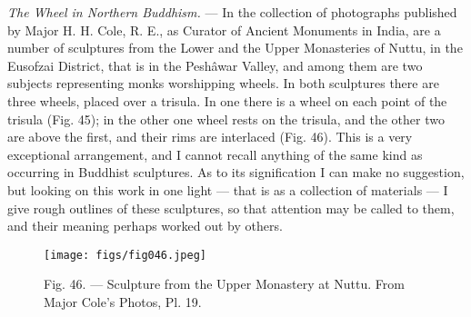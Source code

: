 \documentclass[a4paper, 11pt, oneside, polutonikogreek, english]{article}
\begin{document}
\emph{The Wheel in Northern Buddhism.} --- In the collection of photographs published by Major H. H. Cole, R. E., as Curator of Ancient Monuments in India, are a number of sculptures from the Lower and the Upper Monasteries of Nuttu, in the Eusofzai District, that is in the Peshâwar Valley, and among them are two subjects representing monks worshipping wheels. In both sculptures there are three wheels, placed over a trisula. In one there is a wheel on each point of the trisula (Fig. 45); in the other one wheel rests on the trisula, and the other two are above the first, and their rims are interlaced (Fig. 46). This is a very exceptional arrangement, and I cannot recall anything of the same kind as occurring in Buddhist sculptures. As to its signification I can make no suggestion, but looking on this work in one light --- that is as a collection of materials --- I give rough outlines of these sculptures, so that attention may be called to them, and their meaning perhaps worked out by others.

\begin{figure}[H]
\centering
\texttt{[image: figs/fig046.jpeg]}
\caption[Fig. 46. --- Sculpture from the Upper Monastery at Nuttu.]{Fig. 46. --- Sculpture from the Upper Monastery at Nuttu. From Major Cole's Photos, Pl. 19.}
\end{figure}
\end{document}
